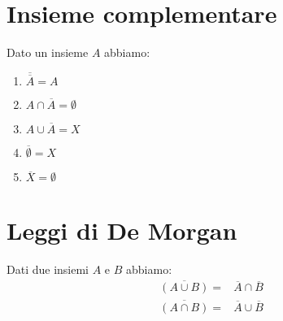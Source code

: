 \section{Insieme complementare}
{\centering
	
\par}
\begin{thm}
Dato un insieme $A$ abbiamo:
\begin{enumerate}
	\item $\overline{\overline{A}}=A$
	\item $A\cap\overline{A}=\emptyset$
	\item $A\cup\overline{A}=X$
	\item $\overline{\emptyset}=X$
	\item $\overline{X}=\emptyset$
\end{enumerate}
\end{thm}
\section{Leggi di De Morgan}
\begin{thm}
Dati due insiemi $A$ e $B$ abbiamo:
\begin{align*}
\overline{\left(A\cup B\right)}=&\overline{A}\cap\overline{B}\\
\overline{\left(A\cap B\right)}=&\overline{A}\cup\overline{B}
\end{align*}
\end{thm}
